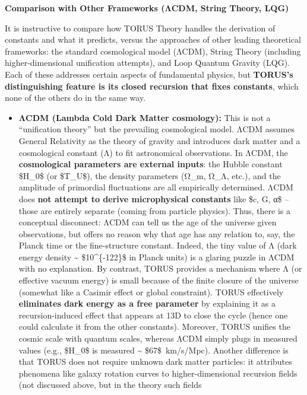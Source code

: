 \documentclass[]{article}
\begin{document}
\textbf{Comparison with Other Frameworks (ΛCDM, String Theory, LQG)}

It is instructive to compare how TORUS Theory handles the derivation of
constants and what it predicts, versus the approaches of other leading
theoretical frameworks: the standard cosmological model (ΛCDM), String
Theory (including higher-dimensional unification attempts), and Loop
Quantum Gravity (LQG). Each of these addresses certain aspects of
fundamental physics, but \textbf{TORUS's distinguishing feature is its
closed recursion that fixes constants}, which none of the others do in
the same way.

\begin{itemize}
\item
  \textbf{ΛCDM (Lambda Cold Dark Matter cosmology):} This is not a
  ``unification theory'' but the prevailing cosmological model. ΛCDM
  assumes General Relativity as the theory of gravity and introduces
  dark matter and a cosmological constant (Λ) to fit astronomical
  observations. In ΛCDM, the \textbf{cosmological parameters are
  external inputs}: the Hubble constant \$H\_0\$ (or \$T\_U\$), the
  density parameters (Ω\_m, Ω\_Λ, etc.), and the amplitude of primordial
  fluctuations are all empirically determined. ΛCDM does \textbf{not
  attempt to derive microphysical constants} like \$c, G, α\$ -- those
  are entirely separate (coming from particle physics). Thus, there is a
  conceptual disconnect: ΛCDM can tell us the age of the universe given
  observations, but offers no reason why that age has any relation to,
  say, the Planck time or the fine-structure constant. Indeed, the tiny
  value of Λ (dark energy density \textasciitilde{} \$10\^{}\{-122\}\$
  in Planck units) is a glaring puzzle in ΛCDM with no explanation. By
  contrast, TORUS provides a mechanism where Λ (or effective vacuum
  energy) is small because of the finite closure of the universe
  (somewhat like a Casimir effect or global constraint)​. TORUS
  effectively \textbf{eliminates dark energy as a free parameter} by
  explaining it as a recursion-induced effect that appears at 13D to
  close the cycle (hence one could calculate it from the other
  constants)​. Moreover, TORUS unifies the cosmic scale with quantum
  scales, whereas ΛCDM simply plugs in measured values (e.g., \$H\_0\$
  is measured \textasciitilde{} \$67\$~km/s/Mpc). Another difference is
  that TORUS does not require unknown dark matter particles: it
  attributes phenomena like galaxy rotation curves to higher-dimensional
  recursion fields (not discussed above, but in the theory such fields

\end{itemize}
\end{document}
